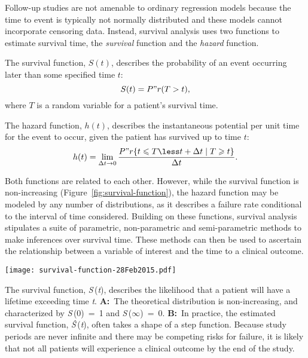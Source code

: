 Follow-up studies are not amenable to ordinary regression models because the
time to event is typically not normally distributed and these models cannot
incorporate censoring data.  Instead, survival analysis uses two functions to
estimate survival time, the \emph{survival} function and the \emph{hazard}
function.

The survival function, $S(t)$, describes the probability of an event occurring
later than some specified time $t$:
\begin{equation}
  \label{eq:survival-function}
  S(t) = P"r(T > t),
\end{equation}
where $T$ is a random variable for a patient's survival time.

The hazard function, $h(t)$, describes the instantaneous potential per unit time
for the event to occur, given the patient has survived up to time $t$:
\begin{equation}
  \label{eq:hazard-function}
  h(t) = \lim_{\Delta t \to 0}\frac{P"r\{t \leqslant T \less t + \Delta t
    \mid T \geqslant t \}}{\Delta t}.
\end{equation}


Both functions are related to each other.  However, while the survival function
is non-increasing (Figure~\ref{fig:survival-function}), the hazard function may
be modeled by any number of distributions, as it describes a failure rate
conditional to the interval of time considered.  Building on these functions,
survival analysis stipulates a suite of parametric, non-parametric and
semi-parametric methods to make inferences over survival time.  These methods
can then be used to ascertain the relationship between a variable of interest
and the time to a clinical outcome.

\begin{marginfigure}%
  \texttt{[image: survival-function-28Feb2015.pdf]}
  \caption[Survival function]{The survival function, \emph{S}\,(\emph{t}),
    describes the likelihood that a patient will have a lifetime exceeding time
    \emph{t}.  \textbf{A:}~The theoretical distribution is non-increasing, and
    characterized by \mbox{\emph{S}\,(0) = 1} and \mbox{\emph{S}\,($\infty$) =
      0}.  \textbf{B:}~In practice, the estimated survival function,
    \emph{\^{S}}\,(\emph{t}), often takes a shape of a step function.  Because
    study periods are never infinite and there may be competing risks for
    failure, it is likely that not all patients will experience a clinical
    outcome by the end of the study.}\label{fig:survival-function}%
\end{marginfigure}

